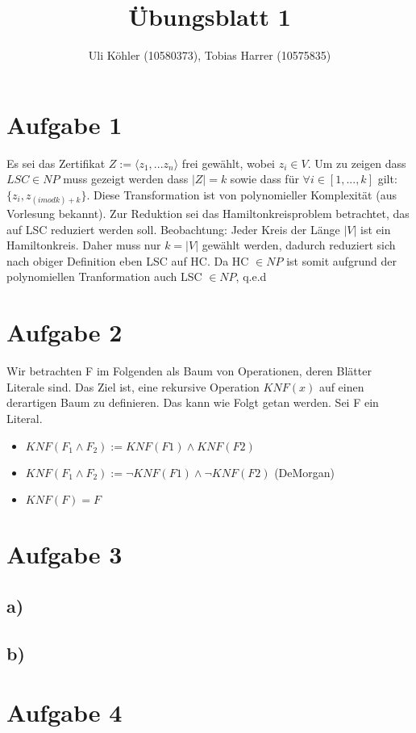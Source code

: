 \documentclass[a4paper,10pt,oneside,leqno]{scrartcl}
\title{Übungsblatt 1}
\author{Uli Köhler (10580373), Tobias Harrer (10575835)}
\begin{document}
\maketitle
\section*{Aufgabe 1}%
Es sei das Zertifikat $Z := \langle z_1,...z_n\rangle$ frei gewählt, wobei $z_i \in V$.
Um zu zeigen dass $LSC \in NP$ muss gezeigt werden dass $|Z| = k$ sowie dass für $\forall i \in [1,...,k]$ gilt:
$\{z_i,z_{(i mod k) + k}\}$. Diese Transformation ist von polynomieller Komplexität (aus Vorlesung bekannt).
Zur Reduktion sei das Hamiltonkreisproblem betrachtet, das auf LSC reduziert werden soll.
Beobachtung: Jeder Kreis der Länge $|V|$ ist ein Hamiltonkreis. Daher muss nur $k = |V|$ gewählt werden, dadurch reduziert sich nach obiger Definition eben LSC auf HC. Da HC $\in NP$ ist somit aufgrund der polynomiellen Tranformation auch LSC $\in NP$, q.e.d

\section*{Aufgabe 2}%
Wir betrachten F im Folgenden als Baum von Operationen, deren Blätter Literale sind.
Das Ziel ist, eine rekursive Operation $KNF(x)$ auf einen derartigen Baum zu definieren. Das kann wie Folgt getan werden. Sei F ein Literal.
\begin{itemize}
 \item $KNF(F_1 \wedge F_2) := KNF(F1) \wedge KNF(F2)$
 \item $KNF(F_1 \wedge F_2) := \neg KNF(F1) \wedge \neg KNF(F2)$ (DeMorgan)
 \item $KNF(F) = F$
\end{itemize}

\section*{Aufgabe 3}%
\subsection*{a)}

\subsection*{b)}

\section*{Aufgabe 4}%
\end{document}
